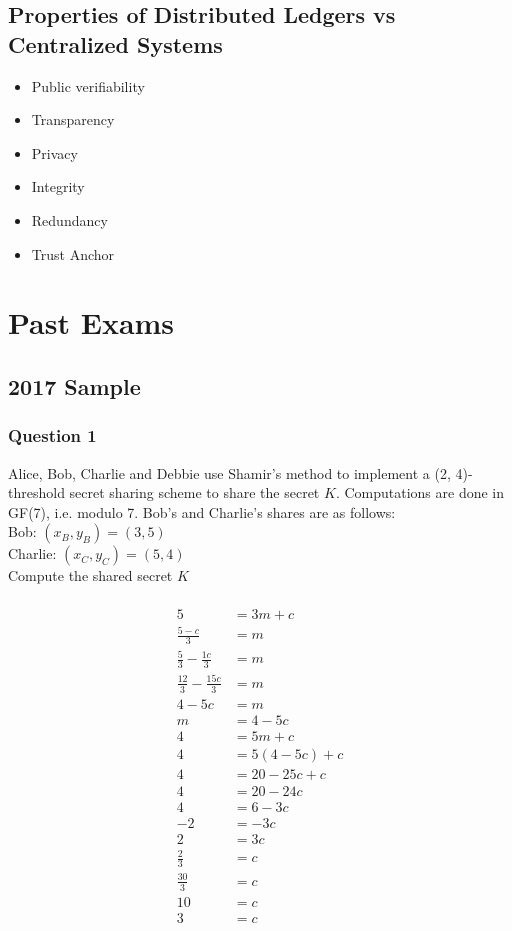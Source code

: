 \documentclass[12pt, a4paper]{report}
\begin{document}
\begin{multicols*}{2}
\section{Properties of Distributed Ledgers vs Centralized Systems}
\begin{itemize}
	\item Public verifiability
	\item Transparency
	\item Privacy
	\item Integrity
	\item Redundancy
	\item Trust Anchor
\end{itemize}

\chapter{Past Exams}
\section{2017 Sample}

\subsection{Question 1}
Alice, Bob, Charlie and Debbie use Shamir's method to implement a (2, 4)-threshold secret sharing scheme to share the secret $K$. Computations are done in GF(7), i.e. modulo 7. Bob's and Charlie's shares are as follows:\\
Bob: $(x_B,y_B)=(3,5)$\\
Charlie: $(x_C,y_C)=(5,4)$\\
Compute the shared secret $K$\\\\

\begin{align*}
	5 &= 3m+c \tag{Bob}\\
	\frac{5-c}{3} &= m\\
	\frac{5}{3} - \frac{1c}{3} &= m\\
	\frac{12}{3} - \frac{15c}{3} &= m\\
	4 - 5c &= m\\
	m &= 4-5c\\
	4 &= 5m+c \tag{Charlie}\\
	4 &= 5(4-5c)+c\tag{Sub Bob into Charlie}\\
	4 &= 20 - 25c + c\\
	4 &= 20 - 24c\\
	4 &= 6 - 3c\\
	-2 &= -3c\\
	2 &= 3c\\
	\frac{2}{3} &= c\\
	\frac{30}{3} &= c\\
	10 &= c\\
	3 &= c
\end{align*}


\end{multicols*}
\end{document}
